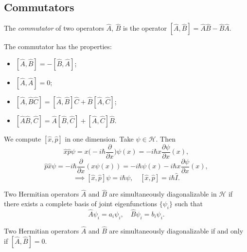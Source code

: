 \documentclass[12pt]{article}
\begin{document}
\subsection{Commutators}%
\label{sub:commutators}

\begin{definition}
	The \textit{commutator} of two operators $\hat A$, $\hat B$ is the operator $[\hat A, \hat B] = \hat A \hat B - \hat B \hat A$.
\end{definition}

The commutator has the properties:
\begin{itemize}
	\item $[\hat A, \hat B] = - [\hat B, \hat A]$;
	\item $[\hat A, \hat A] = 0$;
	\item $[\hat A, \hat B \hat C] = [\hat A, \hat B] \hat C + \hat B[\hat A, \hat C]$;
	\item $[\hat A \hat B, \hat C] = \hat A[\hat B, \hat C] + [\hat A, \hat C]\hat B$.
\end{itemize}

\begin{exbox}
	We compute $[\hat x, \hat p]$ in one dimension. Take $\psi \in \mathcal{H}$. Then
	\[
		\hat x \hat p \psi = x \biggl( - i \hbar \frac{\partial}{\partial x} \biggr) \psi(x) = - i \hbar x \frac{\partial \psi}{\partial x}(x),
	\]
	\[
		\hat p \hat x \psi = - i \hbar \frac{\partial}{\partial x} (x \psi(x)) = - i \hbar \psi(x) - i \hbar x \frac{\partial \psi}{\partial x}(x)
	,\]
	\[
		\implies [\hat x, \hat p]\psi = i \hbar \psi, \quad [\hat x, \hat p] = i \hbar \hat I
	.\]
\end{exbox}

\begin{definition}
	Two Hermitian operators $\hat A$ and $\hat B$ are simultaneously diagonalizable in $\mathcal{H}$ if there exists a complete basis of joint eigenfunctions $\{\psi_i\}$ such that
	\[
	\hat A \psi_i = a_i \psi_i, \quad \hat B \psi_i = b_i \psi_i
	.\]
\end{definition}

\begin{theorem}
	Two Hermitian operators $\hat A$ and $\hat B$ are simultaneously diagonalizable if and only if $[\hat A, \hat B] = 0$.
\end{theorem}
\end{document}
